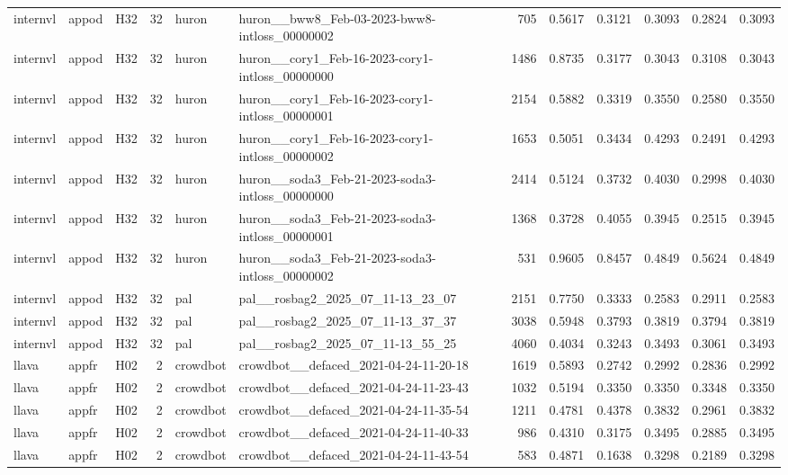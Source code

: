 \begin{table}[tbp]
\begin{tabular}{lllrllrrrrrr}
internvl & appod & H32 & 32 & huron & huron\_\_bww8\_Feb-03-2023-bww8-intloss\_00000002 & 705 & 0.5617 & 0.3121 & 0.3093 & 0.2824 & 0.3093 \\
internvl & appod & H32 & 32 & huron & huron\_\_cory1\_Feb-16-2023-cory1-intloss\_00000000 & 1486 & 0.8735 & 0.3177 & 0.3043 & 0.3108 & 0.3043 \\
internvl & appod & H32 & 32 & huron & huron\_\_cory1\_Feb-16-2023-cory1-intloss\_00000001 & 2154 & 0.5882 & 0.3319 & 0.3550 & 0.2580 & 0.3550 \\
internvl & appod & H32 & 32 & huron & huron\_\_cory1\_Feb-16-2023-cory1-intloss\_00000002 & 1653 & 0.5051 & 0.3434 & 0.4293 & 0.2491 & 0.4293 \\
internvl & appod & H32 & 32 & huron & huron\_\_soda3\_Feb-21-2023-soda3-intloss\_00000000 & 2414 & 0.5124 & 0.3732 & 0.4030 & 0.2998 & 0.4030 \\
internvl & appod & H32 & 32 & huron & huron\_\_soda3\_Feb-21-2023-soda3-intloss\_00000001 & 1368 & 0.3728 & 0.4055 & 0.3945 & 0.2515 & 0.3945 \\
internvl & appod & H32 & 32 & huron & huron\_\_soda3\_Feb-21-2023-soda3-intloss\_00000002 & 531 & 0.9605 & 0.8457 & 0.4849 & 0.5624 & 0.4849 \\
internvl & appod & H32 & 32 & pal & pal\_\_rosbag2\_2025\_07\_11-13\_23\_07 & 2151 & 0.7750 & 0.3333 & 0.2583 & 0.2911 & 0.2583 \\
internvl & appod & H32 & 32 & pal & pal\_\_rosbag2\_2025\_07\_11-13\_37\_37 & 3038 & 0.5948 & 0.3793 & 0.3819 & 0.3794 & 0.3819 \\
internvl & appod & H32 & 32 & pal & pal\_\_rosbag2\_2025\_07\_11-13\_55\_25 & 4060 & 0.4034 & 0.3243 & 0.3493 & 0.3061 & 0.3493 \\
llava & appfr & H02 & 2 & crowdbot & crowdbot\_\_defaced\_2021-04-24-11-20-18 & 1619 & 0.5893 & 0.2742 & 0.2992 & 0.2836 & 0.2992 \\
llava & appfr & H02 & 2 & crowdbot & crowdbot\_\_defaced\_2021-04-24-11-23-43 & 1032 & 0.5194 & 0.3350 & 0.3350 & 0.3348 & 0.3350 \\
llava & appfr & H02 & 2 & crowdbot & crowdbot\_\_defaced\_2021-04-24-11-35-54 & 1211 & 0.4781 & 0.4378 & 0.3832 & 0.2961 & 0.3832 \\
llava & appfr & H02 & 2 & crowdbot & crowdbot\_\_defaced\_2021-04-24-11-40-33 & 986 & 0.4310 & 0.3175 & 0.3495 & 0.2885 & 0.3495 \\
llava & appfr & H02 & 2 & crowdbot & crowdbot\_\_defaced\_2021-04-24-11-43-54 & 583 & 0.4871 & 0.1638 & 0.3298 & 0.2189 & 0.3298 \\

\end{tabular}
\end{table}
